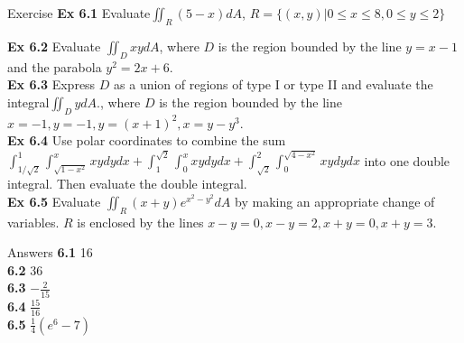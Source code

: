 \documentclass[aspectratio=169, UTF8]{beamer}
\begin{document}
\begin{frame}{Exercise}
    \textbf{Ex 6.1 }Evaluate$\iint_R(5-x)dA$, $R=\{(x,y)|0\leq x
    \leq 8,0\leq y\leq2\}$\\
    \par
    \textbf{Ex 6.2 }Evaluate $\iint_DxydA$, where $D$ is the region bounded by the line $y=x-1$ and the parabola $y^2=2x+6$.\\
    \textbf{Ex 6.3 }Express $D$ as a union of regions of type I or type II and evaluate the integral$\iint_D ydA$., where $D$ is the region bounded by the line $x=-1,y=-1,y=(x+1)^2,x=y-y^3$.\\
     \textbf{Ex 6.4} Use polar coordinates to combine the sum
     $\int_{1/\sqrt{2}}^1\int_{\sqrt{1-x^2}}^xxydydx+\int_1^{\sqrt{2}}\int_0^xxydydx+\int_{\sqrt{2}}^2\int_0^{\sqrt{4-x^2}}xydydx$ into one double integral. Then evaluate the double integral.\\
    \textbf{Ex 6.5} Evaluate $\iint_R(x+y)e^{x^2-y^2}dA$ by making an appropriate change of variables. $R$ is enclosed by the lines $x-y=0,x-y=2,x+y=0,x+y=3$.
\end{frame}
\begin{frame}{Answers}
    \textbf{6.1} 16\\
    \textbf{6.2} 36\\
    \textbf{6.3} $-\frac{2}{15}$\\
    \textbf{6.4} $\frac{15}{16}$\\
    \textbf{6.5} $\frac{1}{4}(e^6-7)$
\end{frame}
\end{document}

